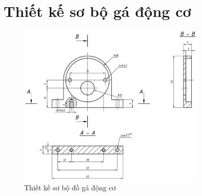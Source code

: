     \section{Thiết kế sơ bộ gá động cơ}
        \begin{figure}[H]
            \centering
            \includegraphics[width=0.8\textwidth]{pictures/chapter3/ga_dc.png}
            \caption{Thiết kế sơ bộ đồ gá động cơ}
            \label{ga_dc}
        \end{figure}
